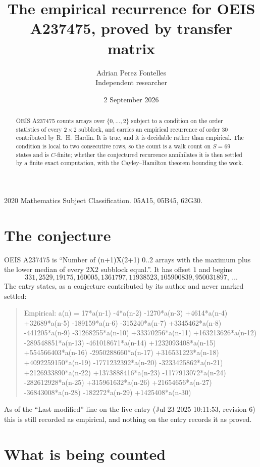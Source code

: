 \documentclass[11pt,a4paper]{article}
\title{The empirical recurrence for OEIS A237475, proved by transfer matrix}
\author{Adrian Perez Fontelles\\ \small Independent researcher}
\date{2 September 2026}
\theoremstyle{plain}
\theoremstyle{definition}
\begin{document}
\maketitle

\begin{abstract}
OEIS A237475 counts arrays over $\{0,\dots,2\}$ subject to a condition on the order
statistics of every $2\times2$ subblock, and carries an empirical recurrence of order
$30$ contributed by R.~H.~Hardin. It is true, and it is decidable rather than empirical.
The condition is local to two consecutive rows, so the count is a walk count on $S=69$
states and is $C$-finite; whether the conjectured recurrence annihilates it is then settled by
a finite exact computation, with the Cayley--Hamilton theorem bounding the work.
\end{abstract}

\noindent\small 2020 Mathematics Subject Classification. 05A15, 05B45, 62G30.\normalsize

\section{The conjecture}

OEIS A237475 is ``Number of (n+1)X(2+1) 0..2 arrays with the maximum plus the lower median of every 2X2 subblock equal.''. It has offset $1$ and begins
\[
331, 2529, 19175, 160005, 1361797, 11938523, 105900839, 950031897,\ \dots
\]
The entry states, as a conjecture contributed by its author and never marked settled:
\begin{quote}
Empirical: a(n) = 17*a(n-1) -4*a(n-2) -1270*a(n-3) +4614*a(n-4) +32689*a(n-5) -189159*a(n-6) -315240*a(n-7) +3345462*a(n-8) -441205*a(n-9) -31268255*a(n-10) +33370256*a(n-11) +163213626*a(n-12) -289548851*a(n-13) -461018671*a(n-14) +1232093408*a(n-15) +554566403*a(n-16) -2950288660*a(n-17) +316531223*a(n-18) +4092259150*a(n-19) -1771232392*a(n-20) -3233425862*a(n-21) +2126933890*a(n-22) +1373888416*a(n-23) -1177913072*a(n-24) -282612928*a(n-25) +315961632*a(n-26) +21654656*a(n-27) -36843008*a(n-28) -182272*a(n-29) +1425408*a(n-30)
\end{quote}
As of the ``Last modified'' line on the live entry (Jul 23 2025 10:11:53, revision 6) this is still
recorded as empirical, and nothing on the entry records it as proved.

\section{What is being counted}
\end{document}
